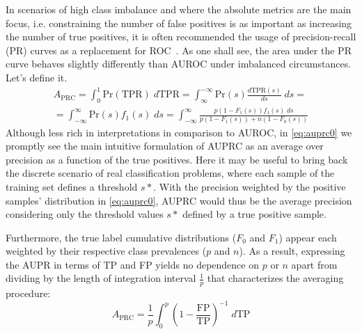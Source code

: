 In scenarios of high class imbalance and where the absolute metrics are the main focus,
i.e. constraining the number of false positives is as important as increasing the number of true positives,
it is often recommended the usage of precision-recall (PR) curves as a replacement for ROC~\cite{ozenne2015precision,he2009learning,krawczyk2016learning,fernandez2018learning}.
As one shall see, the area under the PR curve behaves slightly differently than AUROC under imbalanced circumstances. Let's define it.
%
\begin{multline}
    A_\text{PRC}
    = \int_{0}^{1} \text{Pr}(\text{TPR}) \;d\text{TPR}
    = \int_{\infty}^{-\infty} \text{Pr}(s) \frac{d\text{TPR}(s)}{ds} \;ds
    =\\
    = \int_{-\infty}^{\infty} \text{Pr}(s) f_1(s)\;ds
    = \int_{-\infty}^{\infty} \frac{p (1 - F_1(s)) f_1(s) \;ds}{p (1 - F_1(s)) + n (1 - F_0(s))}
    \label{eq:auprc0}
\end{multline}
%
Although less rich in interpretations in comparison to AUROC, in \autoref{eq:auprc0} we promptly see the main intuitive formulation of AUPRC as an average over precision as a function of the true positives. Here it may be useful to bring back the discrete scenario of real classification problems, where each sample of the training set defines a threshold $s*$. With the precision weighted by the positive samples' distribution in \autoref{eq:auprc0}, AUPRC would thus be the average precision considering only the threshold values $s*$ defined by a true positive sample.

Furthermore, the true label cumulative distributions ($F_0$ and $F_1$) appear each weighted by their respective class prevalences ($p$ and $n$). As a result, expressing the AUPR in terms of TP and FP yields no dependence on $p$ or $n$ apart from dividing by the length of integration interval $\frac{1}{p}$ that characterizes the averaging procedure:
%
\begin{equation}
    A_\text{PRC}
    =
        \frac{1}{p}
        \int_{0}^{p}
            \left(1-\frac{\text{FP}}{\text{TP}}\right)^{-1}
        \;d\text{TP}
\end{equation}
%

